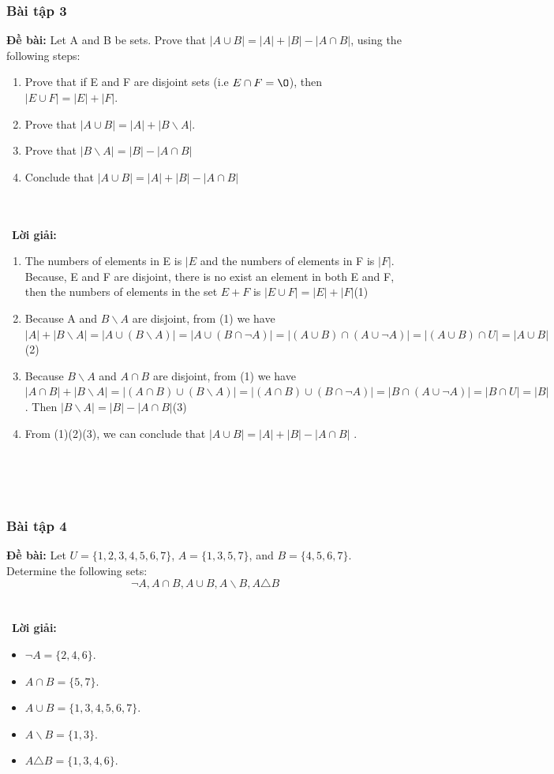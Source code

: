 \documentclass[a4paper]{article}
\begin{document}
\subsubsection{Bài tập 3}
\textbf{Đề bài:} Let A and B be sets. Prove that $|A \cup B|=|A|+|B|-|A \cap B|$, using the following steps:
\begin{enumerate}[1.]
\item Prove that if E and F are disjoint sets (i.e $E \cap F = \O $), then $|E \cup F|=|E| +|F|$.
\item Prove that $|A \cup B|=|A|+|B \backslash A|$.
\item Prove that $|B \backslash A|=|B|-|A \cap B|$
\item Conclude that $|A \cup B|=|A|+|B|-|A \cap B|$  
\end{enumerate}  
\\\ \\\
\textbf{Lời giải:} \begin{enumerate}[1.]
\item The numbers of elements in E is $|E$ and the numbers of elements in F is $|F|$. Because, E and F are disjoint, there is no exist an element in both E and F, then the numbers of elements in the set $E+F$ is $|E \cup F|=|E| +|F|$(1)
\item Because A and $B \backslash A$ are disjoint, from (1) we have $|A|+|B \backslash A|=|A \cup (B \backslash A)|=|A \cup (B \cap \lnot A)|=|(A \cup B) \cap (A \cup \lnot A)|=|(A \cup B) \cap U |=|A \cup B|$(2)  
\item Because $B \backslash A$ and $A \cap B$ are disjoint, from (1) we have $|A \cap B|+|B \backslash A|=|(A \cap B) \cup (B \backslash A)|=|(A \cap B) \cup (B \cap \lnot A)|=|B \cap (A \cup \lnot A)|=|B \cap U|=|B|$. Then $|B \backslash A|=|B|-|A \cap B|$(3)
\item From (1)(2)(3), we can conclude that  $|A \cup B|=|A|+|B|-|A \cap B|$ .  
\end{enumerate}   \\\ \\\
\clearpage
\subsubsection{Bài tập 4}
\textbf{Đề bài:}  Let $U= \{1,2,3,4,5,6,7\}$, $A=\{1,3,5,7\}$, and $B=\{4,5,6,7\}$. Determine the following sets:
$$\lnot A, A \cap B, A \cup B, A \backslash B, A \triangle B$$
\\\ \\\
\textbf{Lời giải:} \begin{itemize}
\item $\lnot A=\{2,4,6\}$.
\item $A \cap B=\{5,7\}$.
\item $A \cup B=\{1,3,4,5,6,7\}$.
\item $A \backslash B=\{1,3\}$.
\item $ A \triangle B=\{1,3,4,6\}$.
\end{itemize} \\\ \\\
\clearpage
\end{document}
